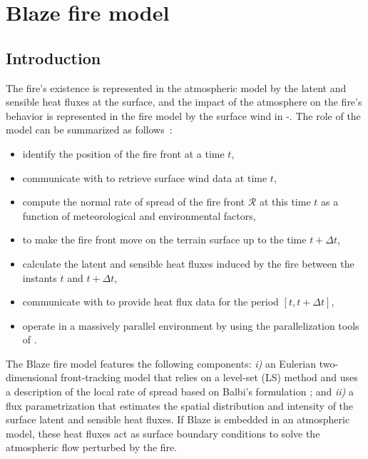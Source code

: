 
\chapter{Blaze fire model}
\minitoc

\section{Introduction}

The fire's existence is represented in the atmospheric model by the latent and sensible heat fluxes at the surface, and the impact of the atmosphere on the fire's behavior is represented in the fire model by the surface wind in \MNH-\Blaze.
The role of the \Blaze{} model can be summarized as follows~:
\begin{itemize}
	\item identify the position of the fire front at a time $t$,
	\item communicate with \MNH{} to retrieve surface wind data at time $t$,
	\item compute the normal rate of spread of the fire front $\mathcal R$ at this time $t$ as a function of meteorological and environmental factors,
	\item to make the fire front move on the terrain surface up to the time $t+\Delta t$,
	\item calculate the latent and sensible heat fluxes induced by the fire between the instants $t$ and $t+\Delta t$,
	\item communicate with \MNH{} to provide heat flux data for the period $[t,t+\Delta t]$,
	\item operate in a massively parallel environment by using the parallelization tools of \MNH.
\end{itemize}

The Blaze fire model features the following components: \textit{i)} an Eulerian two-dimensional front-tracking model that relies on a level-set (LS) method and uses a description of the local rate of spread based on Balbi’s formulation \citep{Balbi2009}; and \textit{ii)} a flux parametrization that estimates the spatial distribution and intensity of the surface latent and sensible heat fluxes. If Blaze is embedded in an atmospheric model, these heat fluxes act as surface boundary conditions to solve the atmospheric flow perturbed by the fire.

